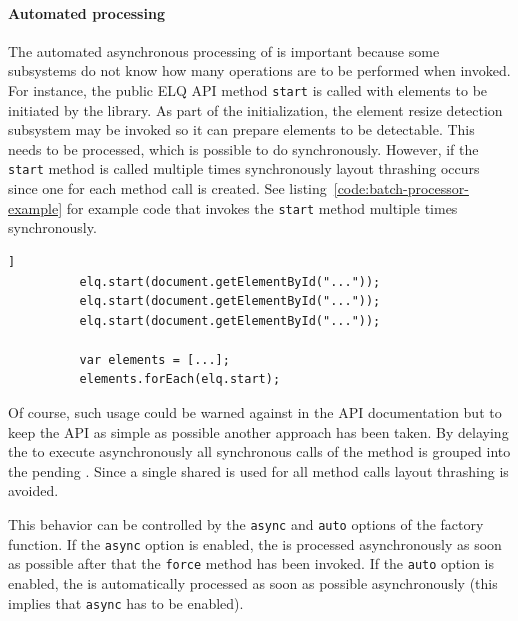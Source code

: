 \documentclass[a4paper,11pt]{kth-mag}
\newcommand{\code}[1]{\texttt{#1}}
\begin{document}
        \paragraph{Automated processing}
        The automated asynchronous processing of  is important because some subsystems do not know how many operations are to be performed when invoked.
        For instance, the public \gls{ELQ} \gls{API} method \code{start} is called with \glspl{element} to be initiated by the library.
        As part of the initialization, the element resize detection subsystem may be invoked so it can prepare \glspl{element} to be detectable.
        This needs to be  processed, which is possible to do synchronously.
        However, if the \code{start} method is called multiple times synchronously \gls{layout thrashing} occurs since one  for each method call is created.
        See listing~\ref{code:batch-processor-example} for example code that invokes the \code{start} method multiple times synchronously.
        \begin{lstlisting}[gobble=10,label={code:batch-processor-example},caption={Example of multiple synchronous calls to the \gls{ELQ} \code{start} method.},captionpos=b]]
          elq.start(document.getElementById("..."));
          elq.start(document.getElementById("..."));
          elq.start(document.getElementById("..."));

          var elements = [...];
          elements.forEach(elq.start);
        \end{lstlisting}
        Of course, such usage could be warned against in the \gls{API} documentation but to keep the \gls{API} as simple as possible another approach has been taken.
        By delaying the  to execute asynchronously all synchronous calls of the method is grouped into the pending .
        Since a single shared  is used for all method calls \gls{layout thrashing} is avoided.
        
        This behavior can be controlled by the \code{async} and \code{auto} options of the  factory function.
        If the \code{async} option is enabled, the  is processed asynchronously as soon as possible after that the \code{force} method has been invoked.
        If the \code{auto} option is enabled, the  is automatically processed as soon as possible asynchronously (this implies that \code{async} has to be enabled).
\end{document}
